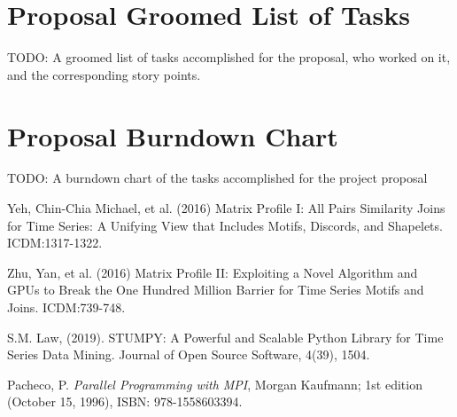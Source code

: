 \documentclass[conference]{IEEEtran}
\begin{document}
\section{Proposal Groomed List of Tasks}
TODO: A groomed list of tasks accomplished for the proposal, who worked on it, and the corresponding story points.

\section{Proposal Burndown Chart}
TODO: A burndown chart of the tasks accomplished for the project proposal




\begin{thebibliography}{4}  

 Yeh, Chin-Chia Michael, et al. (2016) Matrix Profile I: All Pairs Similarity Joins for Time Series: A Unifying View that Includes Motifs, Discords, and Shapelets. ICDM:1317-1322.

 Zhu, Yan, et al. (2016) Matrix Profile II: Exploiting a Novel Algorithm and GPUs to Break the One Hundred Million Barrier for Time Series Motifs and Joins. ICDM:739-748.

 S.M. Law, (2019). STUMPY: A Powerful and Scalable Python Library for Time Series Data Mining. Journal of Open Source Software, 4(39), 1504.

 Pacheco, P. \emph{Parallel Programming with MPI}, Morgan Kaufmann; 1st edition (October 15, 1996), ISBN: 978-1558603394.

\end{thebibliography}
\end{document}
